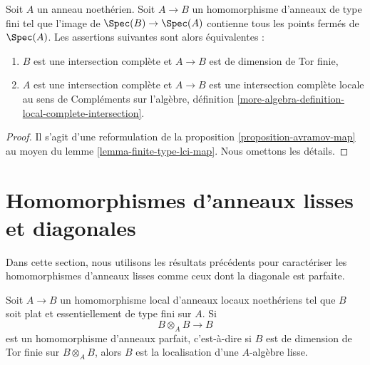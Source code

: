\begin{lemma}
\label{lemma-avramov-map-finite-type}
Soit $A$ un anneau noethérien. Soit $A \to B$ un homomorphisme d'anneaux de type fini
tel que l'image de $\Spec(B) \to \Spec(A)$ contienne tous les points fermés
de $\Spec(A)$. Les assertions suivantes sont alors équivalentes :
\begin{enumerate}
\item $B$ est une intersection complète et $A \to B$ est de dimension de
Tor finie,
\item $A$ est une intersection complète et $A \to B$ est une intersection complète
locale au sens de Compléments sur l'algèbre, définition
\ref{more-algebra-definition-local-complete-intersection}.
\end{enumerate}
\end{lemma}

\begin{proof}
Il s'agit d'une reformulation de la proposition \ref{proposition-avramov-map}
au moyen du lemme \ref{lemma-finite-type-lci-map}.
Nous omettons les détails.
\end{proof}








\section{Homomorphismes d'anneaux lisses et diagonales}
\label{section-smooth-diagonal-perfect}

\noindent
Dans cette section, nous utilisons les résultats précédents pour caractériser les homomorphismes d'anneaux lisses comme
ceux dont la diagonale est parfaite.

\begin{lemma}
\label{lemma-local-perfect-diagonal}
Soit $A \to B$ un homomorphisme local d'anneaux locaux noethériens tel que
$B$ soit plat et essentiellement de type fini sur $A$. Si
$$
B \otimes_A B \longrightarrow B
$$
est un homomorphisme d'anneaux parfait, c'est-à-dire si $B$ est de dimension de Tor finie sur
$B \otimes_A B$, alors $B$ est la localisation d'une $A$-algèbre lisse.
\end{lemma}

